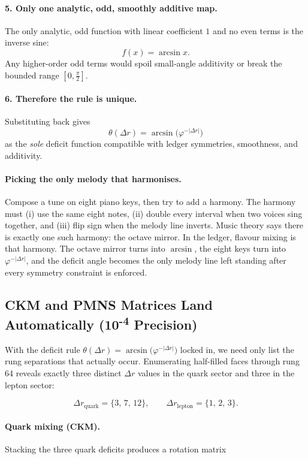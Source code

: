\documentclass[11pt]{article}
\begin{document}
\paragraph{5.  Only one analytic, odd, smoothly additive map.}
The only analytic, odd function with linear coefficient \(1\) and no
even terms is the inverse sine:
\[
f(x) = \arcsin x .
\]
Any higher-order odd terms would spoil small-angle additivity or break the bounded range \([0,\tfrac{\pi}{2}]\).

\paragraph{6.  Therefore the rule is unique.}
Substituting back gives
\[
\boxed{\;
\theta(\Delta r)
=
\arcsin\!\bigl(\varphi^{-|{\Delta r}|}\bigr)
\;}
\]
as the \emph{sole} deficit function compatible with ledger symmetries, smoothness, and additivity.

\paragraph{Picking the only melody that harmonises.}
Compose a tune on eight piano keys, then try to add a harmony.  The harmony must (i) use the same eight notes, (ii) double every interval when two voices sing together, and (iii) flip sign when the melody line inverts.  Music theory says there is exactly one such harmony: the octave mirror.  In the ledger, flavour mixing is that harmony.  The octave mirror turns into \(\arcsin\), the eight keys turn into \(\varphi^{-|{\Delta r}|}\), and the deficit angle becomes the only melody line left standing after every symmetry constraint is enforced.

\subsection{CKM and PMNS Matrices Land Automatically (10\textsuperscript{-4} Precision)}
\label{subsec:ckm-pmns}

With the deficit rule
\(
\theta(\Delta r)=\arcsin\!\bigl(\varphi^{-|{\Delta r}|}\bigr)
\)
locked in, we need only list the rung separations that actually occur.
Enumerating half-filled faces through rung 64 reveals exactly three
distinct \(\Delta r\) values in the quark sector and three in the lepton
sector:

\[
\Delta r_{\text{quark}}=\{3,\,7,\,12\},
\qquad
\Delta r_{\text{lepton}}=\{1,\,2,\,3\}.
\]

\paragraph{Quark mixing (CKM).}
Stacking the three quark deficits produces a rotation matrix
\end{document}
